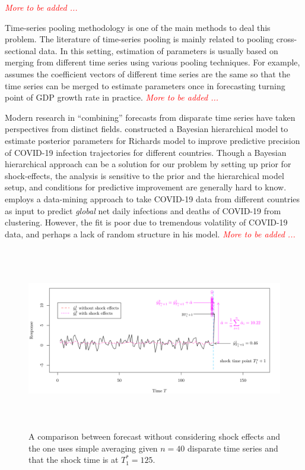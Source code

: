 \documentclass[11pt]{article}
\theoremstyle{definition}
\begin{document}
\vspace{.3cm}

\emph{\textcolor{red}{More to be added ...}}

\vspace{.3cm}

Time-series pooling methodology is one of the main methods to deal this problem. The literature of time-series pooling is mainly related to pooling cross-sectional data. In this setting, estimation of parameters is usually based on merging from different time series using various pooling techniques.  For example, \citet{zellner1991forecasting} assumes the coefficient vectors of different time series are the same so that the time series can be merged to estimate parameters once in forecasting turning point of GDP growth rate in practice. \emph{\textcolor{red}{More to be added ...}}


Modern research in ``combining'' forecasts from disparate time series have taken perspectives from distinct fields.  \citet{lee2020estimation} constructed a Bayesian hierarchical model  to estimate posterior parameters for Richards model to improve predictive precision of COVID-19 infection trajectories for different countries. Though a Bayesian hierarchical approach can be a solution for our problem by setting up prior for shock-effects, the analysis is sensitive to the prior and the hierarchical model setup, and conditions for predictive improvement are generally hard to know. \citet{plessen2020integrated} employs a data-mining approach to take COVID-19 data from different countries as input to predict \emph{global} net daily infections  and deaths of COVID-19 from clustering. However, the fit is poor due to tremendous volatility of COVID-19 data, and perhaps a lack of random structure in his model. \emph{\textcolor{red}{More to be added ...}}



\begin{figure}[t]
  \begin{center}
    \includegraphics[height = 8cm]{comp.pdf}
    \caption{A comparison between forecast without considering shock effects and the one uses simple averaging given $n=40$ disparate time series and that the shock time is at $T_1^* = 125$.}\label{figure1}
  \end{center}  
  \vspace{-.6cm}
\end{figure}
\end{document}
